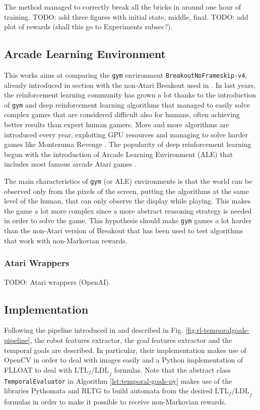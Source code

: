 The method managed to correctly break all the bricks in around one hour of
training. TODO: add three figures with initial state, middle, final.
TODO: add plot of rewards (shall this go to Experiments subsec?).

\subsection{Arcade Learning Environment}
This works aims at comparing the \texttt{gym} environment
\texttt{BreakoutNoFrameskip-v4}, already introduced in section
\label{sec:openaigym} with the non-Atari Breakout used in
\cite{DBLP:journals/corr/abs-1807-06333}. In last years, the reinforcement
learning community has grown a lot thanks to the introduction of \texttt{gym}
and deep reinforcement learning algorithms \cite{mnih2015humanlevel} that
managed to easily solve complex games that are considered difficult also
for humans, often achieving better results than expert human gamers. More
and more algorithms are introduced every year, exploiting GPU resources
and managing to solve harder games like Montezuma Revenge \cite{uber-goexplore}.
The popularity of deep reinforcement learning begun with the introduction of
Arcade Learning Environment (ALE) that includes most
famous arcade Atari games \cite{bellemare13arcade}.

The main characteristics of \texttt{gym} (or ALE) environments is that the
world can be observed only from the pixels of the screen, putting the
algorithms at the same level of the human, that can only observe the display
while playing. This makes the game a lot more complex since a more abstract
reasoning strategy is needed in order to solve the game. This hypothesis should
make \texttt{gym} games a lot harder than the non-Atari version of Breakout
that has been used to test algorithms that work with non-Markovian rewards.

\subsubsection{Atari Wrappers}
TODO: Atari wrappers (OpenAI).

\subsection{Implementation}
Following the pipeline introduced in \cite{DBLP:journals/corr/abs-1807-06333}
and described in Fig. \ref{fig:rl-temporalgoals-pipeline}, the robot features
extractor, the goal features extractor and the temporal goals are described.
In particular, their implementation makes use of OpenCV \cite{opencv-library}
in order to deal
with images easily and a Python implementation of FLLOAT \cite{python-flloat}
to deal with $\text{LTL}_f\text{/LDL}_f$ formulas. Note that the abstract
class \texttt{TemporalEvaluator} in Algorithm \ref{lst:temporal-goals-py}
makes use of the libraries Pythomata \cite{pythomata} and RLTG \cite{rltg} to
build automata from the desired $\text{LTL}_f\text{/LDL}_f$ formulas in order
to make it possible to receive non-Markovian rewards.

